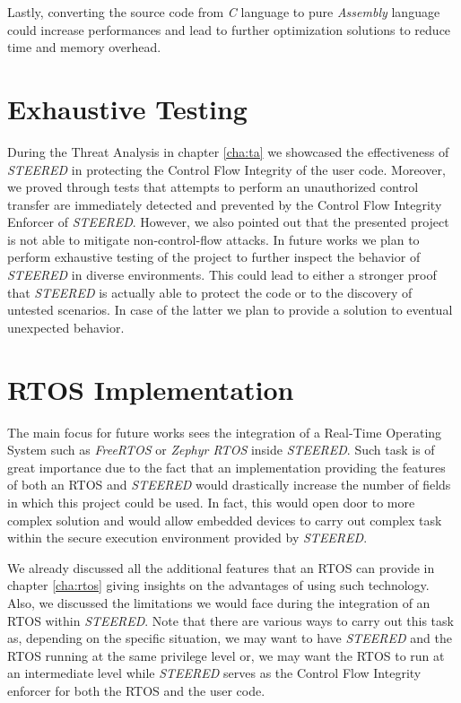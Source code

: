Lastly, converting the source code from \textit{C} language to pure \textit{Assembly}
language could increase performances and lead to further optimization solutions to
reduce time and memory overhead.

\section{Exhaustive Testing}
\label{sec:future_testing}

During the Threat Analysis in chapter \ref{cha:ta} we showcased the
effectiveness of \textit{STEERED} in protecting the Control Flow Integrity of the
user code. Moreover, we proved through tests that attempts to perform an unauthorized
control transfer are immediately detected and prevented by the Control Flow Integrity
Enforcer of \textit{STEERED}. However, we also pointed out that the presented
project is not able to mitigate non-control-flow attacks. In future works we plan
to perform exhaustive testing of the project to further inspect the behavior of \textit{STEERED}
in diverse environments. This could lead to either a stronger proof that \textit{STEERED}
is actually able to protect the code or to the discovery of untested scenarios. In
case of the latter we plan to provide a solution to eventual unexpected behavior.

\section{RTOS Implementation}
\label{sec:future_rtos}

The main focus for future works sees the integration of a Real-Time Operating
System such as \textit{FreeRTOS} or \textit{Zephyr RTOS} inside \textit{STEERED}.
Such task is of great importance due to the fact that an implementation
providing the features of both an RTOS and \textit{STEERED} would drastically increase
the number of fields in which this project could be used. In fact, this would open
door to more complex solution and would allow embedded devices to carry out complex
task within the secure execution environment provided by \textit{STEERED}.

We already discussed all the additional features that an RTOS can provide in
chapter \ref{cha:rtos} giving insights on the advantages of using such
technology. Also, we discussed the limitations we would face during the
integration of an RTOS within \textit{STEERED}. Note that there are various ways
to carry out this task as, depending on the specific situation, we may want to
have \textit{STEERED} and the RTOS running at the same privilege level or, we
may want the RTOS to run at an intermediate level while \textit{STEERED} serves as
the Control Flow Integrity enforcer for both the RTOS and the user code.

